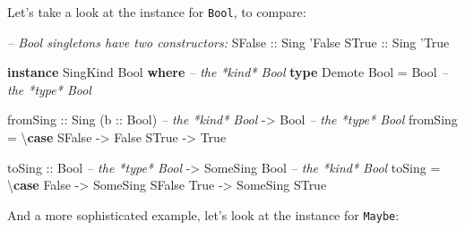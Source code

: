 \documentclass[]{article}
\newenvironment{Shaded}{}{}
\newcommand{\CharTok}[1]{\textcolor[rgb]{0.25,0.44,0.63}{#1}}
\newcommand{\CommentTok}[1]{\textcolor[rgb]{0.38,0.63,0.69}{\textit{#1}}}
\newcommand{\DataTypeTok}[1]{\textcolor[rgb]{0.56,0.13,0.00}{#1}}
\newcommand{\FunctionTok}[1]{\textcolor[rgb]{0.02,0.16,0.49}{#1}}
\newcommand{\KeywordTok}[1]{\textcolor[rgb]{0.00,0.44,0.13}{\textbf{#1}}}
\newcommand{\NormalTok}[1]{#1}
\newcommand{\OtherTok}[1]{\textcolor[rgb]{0.00,0.44,0.13}{#1}}
\begin{document}
Let's take a look at the instance for \texttt{Bool}, to compare:

\begin{Shaded}
\begin{Highlighting}[]
\CommentTok{-- Bool singletons have two constructors:}
\DataTypeTok{SFalse}\OtherTok{ ::} \DataTypeTok{Sing} \CharTok{'False}
\DataTypeTok{STrue}\OtherTok{  ::} \DataTypeTok{Sing} \CharTok{'True}

\KeywordTok{instance} \DataTypeTok{SingKind} \DataTypeTok{Bool} \KeywordTok{where}    \CommentTok{-- the *kind* Bool}
    \KeywordTok{type} \DataTypeTok{Demote} \DataTypeTok{Bool} \FunctionTok{=} \DataTypeTok{Bool}     \CommentTok{-- the *type* Bool}

\NormalTok{    fromSing}
\OtherTok{        ::} \DataTypeTok{Sing}\NormalTok{ (}\OtherTok{b ::} \DataTypeTok{Bool}\NormalTok{)        }\CommentTok{-- the *kind* Bool}
        \OtherTok{->} \DataTypeTok{Bool}                    \CommentTok{-- the *type* Bool}
\NormalTok{    fromSing }\FunctionTok{=}\NormalTok{ \textbackslash{}}\KeywordTok{case}
        \DataTypeTok{SFalse} \OtherTok{->} \DataTypeTok{False}
        \DataTypeTok{STrue}  \OtherTok{->} \DataTypeTok{True}

\NormalTok{    toSing}
\OtherTok{        ::} \DataTypeTok{Bool}                    \CommentTok{-- the *type* Bool}
        \OtherTok{->} \DataTypeTok{SomeSing} \DataTypeTok{Bool}           \CommentTok{-- the *kind* Bool}
\NormalTok{    toSing }\FunctionTok{=}\NormalTok{ \textbackslash{}}\KeywordTok{case}
        \DataTypeTok{False} \OtherTok{->} \DataTypeTok{SomeSing} \DataTypeTok{SFalse}
        \DataTypeTok{True}  \OtherTok{->} \DataTypeTok{SomeSing} \DataTypeTok{STrue}
\end{Highlighting}
\end{Shaded}

And a more sophisticated example, let's look at the instance for \texttt{Maybe}:
\end{document}
